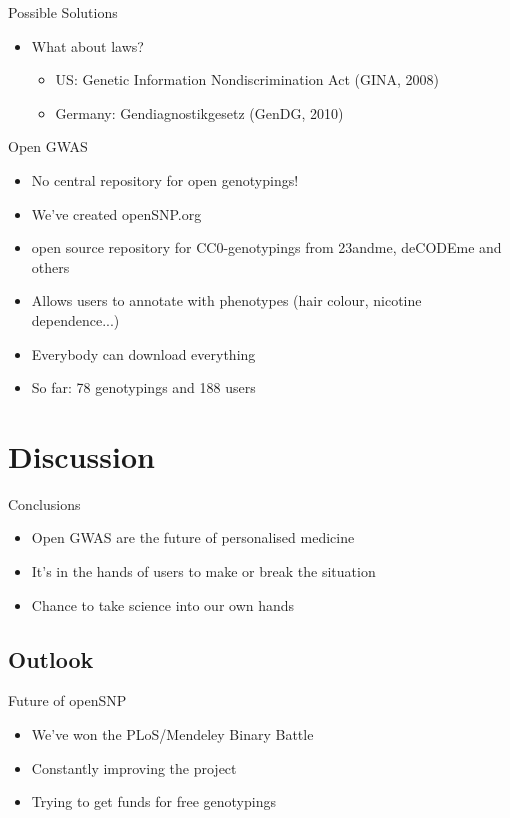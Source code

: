\documentclass[12pt,a4paper]{beamer}
\begin{document}
\begin{frame}{Possible Solutions}
\begin{itemize}
\item What about laws?
\begin{itemize} 
\pause \item US: Genetic Information Nondiscrimination Act (GINA, 2008)
\pause \item Germany: Gendiagnostikgesetz (GenDG, 2010)
\end{itemize}
\end{itemize}
\end{frame}

\begin{frame}{Open GWAS}
\begin{itemize}
\item No central repository for open genotypings!
\pause \item We've created openSNP.org
\pause \item open source repository for CC0-genotypings from 23andme, deCODEme and others
\pause \item Allows users to annotate with phenotypes (hair colour, nicotine dependence...)
\pause \item Everybody can download everything
\pause \item So far: 78 genotypings and 188 users %
\end{itemize}
\end{frame}

\section{Discussion}
\begin{frame}{Conclusions}
\begin{itemize}
\item Open GWAS are the future of personalised medicine
\pause \item It's in the hands of users to make or break the situation
\pause \item Chance to take science into our own hands %
\end{itemize}
\end{frame}

\subsection{Outlook}
\begin{frame}{Future of openSNP}
\begin{itemize}
\item We've won the PLoS/Mendeley Binary Battle
\pause \item Constantly improving the project
\pause \item Trying to get funds for free genotypings
\end{itemize}
\end{frame}
\end{document}
